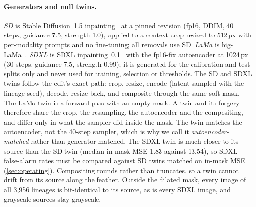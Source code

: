 \paragraph{Generators and null twins.}
\emph{SD} is Stable Diffusion~1.5 inpainting~\cite{rombach2022ldm} at a pinned revision (fp16, DDIM, 40 steps, guidance 7.5, strength 1.0), applied to a context crop resized to 512\,px with per-modality prompts and no fine-tuning; %
all removals use SD.
\emph{LaMa} is big-LaMa~\cite{suvorov2022lama}.
\emph{SDXL} is SDXL inpainting~0.1~\cite{podell2024sdxl} with the fp16-fix autoencoder at 1024\,px (30 steps, guidance 7.5, strength 0.99); %
it is generated for the calibration and test splits only and never used for training, selection or thresholds.
The SD and SDXL twins follow the edit's exact path: crop, resize, encode (latent sampled with the lineage seed), decode, resize back, and composite through the same soft mask.
The LaMa twin is a forward pass with an empty mask.
A twin and its forgery therefore share the crop, the resampling, the autoencoder and the compositing, and differ only in what the sampler did inside the mask.
The twin matches the autoencoder, not the 40-step sampler, which is why we call it \emph{autoencoder-matched} rather than generator-matched.
The SDXL twin is much closer to its source than the SD twin (median in-mask MSE 1.83 against 13.54), %
so SDXL false-alarm rates must be compared against SD twins matched on in-mask MSE (\cref{sec:operating}).
Compositing rounds rather than truncates, so a twin cannot drift from its source along the feather.
Outside the dilated mask, every image of all 3,956 lineages is bit-identical to its source, %
as is every SDXL image, %
and grayscale sources stay grayscale.

